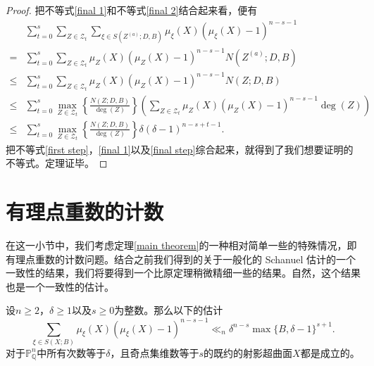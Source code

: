 \begin{proof}
把不等式\eqref{final 1}和不等式\eqref{final 2}结合起来看，便有
\begin{align} \label{final step}
& \sum_{t=0}^{s} \sum_{Z\in\mathcal{Z}_t} \sum_{\xi\in S(Z^{(a)};D,B)} \mu_\xi(X)(\mu_\xi(X)-1)^{n-s-1} \nonumber \\
= & \sum_{t=0}^{s} \sum_{Z\in\mathcal{Z}_t} \mu_Z(X)(\mu_Z(X)-1)^{n-s-1}N(Z^{(a)};D,B) \\
\leqslant & \sum_{t=0}^{s} \sum_{Z\in\mathcal{Z}_t} \mu_Z(X)(\mu_Z(X)-1)^{n-s-1}N(Z;D,B) \\
\leqslant & \sum_{t=0}^{s} \max_{Z\in\mathcal{Z}_t} \left\{\frac{N(Z;D,B)}{\deg(Z)}\right\} \left(\sum_{Z\in\mathcal{Z}_t} \mu_Z(X)(\mu_Z(X)-1)^{n-s-1}\deg(Z)\right) \\
\leqslant & \sum_{t=0}^s \max_{Z\in\mathcal{Z}_t} \left\{\frac{N(Z;D,B)}{\deg(Z)}\right\} \delta(\delta-1)^{n-s+t-1}.
\end{align}
把不等式\eqref{first step}，\eqref{final 1}以及\eqref{final step}综合起来，就得到了我们想要证明的不等式。定理证毕。
\end{proof}

\section{有理点重数的计数}
在这一小节中，我们考虑定理\ref{main theorem}的一种相对简单一些的特殊情况，即有理点重数的计数问题。结合之前我们得到的关于一般化的 Schanuel 估计的一个一致性的结果，我们将要得到一个比原定理稍微精细一些的结果。自然，这个结果也是一个一致性的估计。

\begin{corollary} \label{main corollary}
设$n \geqslant 2$，$\delta \geqslant 1$以及$s \geqslant 0$为整数。那么以下的估计
\begin{equation} \label{estimate in main corollary}
\sum_{\xi\in S(X;B)} \mu_\xi(X)(\mu_\xi(X)-1)^{n-s-1} \ll_{n} \delta^{n-s}\max\{B,\delta-1\}^{s+1}.
\end{equation}
对于$\mathbb{P}^n_{\mathbb{Q}}$中所有次数等于$\delta$，且奇点集维数等于$s$的既约的射影超曲面$X$都是成立的。
\end{corollary}

